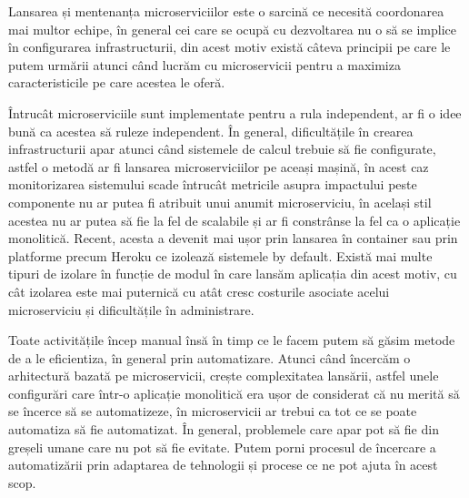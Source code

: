 Lansarea și mentenanța microserviciilor este o sarcină ce necesită coordonarea mai multor echipe, 
în general cei care se ocupă cu dezvoltarea nu o să se implice în configurarea infrastructurii, 
din acest motiv există câteva principii pe care le putem urmării atunci când lucrăm cu microservicii
pentru a maximiza caracteristicile pe care acestea le oferă.

Întrucât microserviciile sunt implementate pentru a rula independent, ar fi o idee bună ca acestea
să ruleze independent. În general, dificultățile în crearea infrastructurii apar atunci când
sistemele de calcul trebuie să fie configurate, astfel o metodă ar fi lansarea microserviciilor
pe aceași mașină, în acest caz monitorizarea sistemului scade întrucât metricile asupra
impactului peste componente nu ar putea fi atribuit unui anumit microserviciu, în același stil
acestea nu ar putea să fie la fel de scalabile și ar fi constrânse la fel ca o aplicație monolitică.
Recent, acesta a devenit mai ușor prin lansarea în container sau prin platforme precum Heroku
ce izolează sistemele by default. Există mai multe tipuri de izolare în funcție de modul în care lansăm
aplicația din acest motiv, cu cât izolarea este mai puternică cu atât cresc costurile asociate
acelui microserviciu și dificultățile în administrare.

Toate activitățile încep manual însă în timp ce le facem putem să găsim metode de a le eficientiza,
în general prin automatizare. Atunci când încercăm o arhitectură bazată pe microservicii, 
crește complexitatea lansării, astfel unele configurări care într-o aplicație monolitică 
era ușor de considerat că nu merită să se încerce să se automatizeze, în microservicii ar trebui
ca tot ce se poate automatiza să fie automatizat. În general, problemele care apar pot să fie 
din greșeli umane care nu pot să fie evitate. Putem porni procesul de încercare a automatizării
prin adaptarea de tehnologii și procese ce ne pot ajuta în acest scop.

